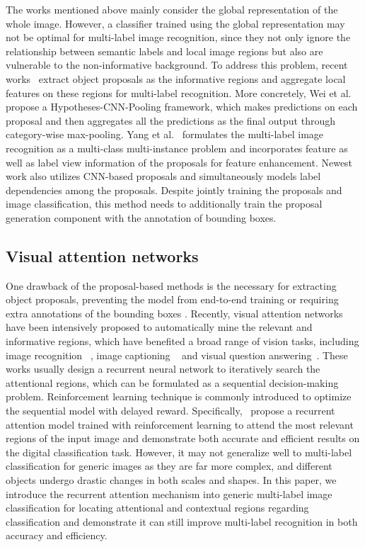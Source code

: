 \documentclass[letterpaper]{article} %
\begin{document}
The works mentioned above mainly consider the global representation of the whole image. However, a classifier trained using the global representation may not be optimal for multi-label image recognition, since they not only ignore the relationship between semantic labels and local image regions but also are vulnerable to the non-informative background. To address this problem, recent works~\cite{yang2016exploit,wei2016hcp} extract object proposals as the informative regions and aggregate local features on these regions for multi-label recognition. More concretely, Wei et al.~\cite{wei2016hcp} propose a Hypotheses-CNN-Pooling framework, which makes predictions on each proposal and then aggregates all the predictions as the final output through category-wise max-pooling. Yang et al.~\cite{yang2016exploit} formulates the multi-label image recognition as a multi-class multi-instance problem and incorporates feature as well as label view information of the proposals for feature enhancement. Newest work \cite{zhang2016multi} also utilizes CNN-based proposals and simultaneously models label dependencies among the proposals. Despite jointly training the proposals and image classification, this method needs to additionally train the proposal generation component with the annotation of bounding boxes.

\subsection{Visual attention networks}
One drawback of the proposal-based methods is the necessary for extracting object proposals, preventing the model from end-to-end training \cite{wei2016hcp,yang2016exploit} or requiring extra annotations of the bounding boxes \cite{zhang2016multi}. Recently, visual attention networks have been intensively proposed to automatically mine the relevant and informative regions, which have benefited a broad range of vision tasks, including image recognition ~\cite{mnih2014recurrent,ba2014multiple,xiao2015application}, image captioning ~\cite{xu2015show} and visual question answering~\cite{xiong2016dynamic}. These works usually design a recurrent neural network to iteratively search the attentional regions, which can be formulated as a sequential decision-making problem. Reinforcement learning technique is commonly introduced to optimize the sequential model with delayed reward. Specifically,~\cite{mnih2014recurrent,ba2014multiple} propose a recurrent attention model trained with reinforcement learning to attend the most relevant regions of the input image and demonstrate both accurate and efficient results on the digital classification task. However, it may not generalize well to multi-label classification for generic images as they are far more complex, and different objects undergo drastic changes in both scales and shapes. In this paper, we introduce the recurrent attention mechanism into generic multi-label image classification for locating attentional and contextual regions regarding classification and demonstrate it can still improve multi-label recognition in both accuracy and efficiency.
\end{document}
